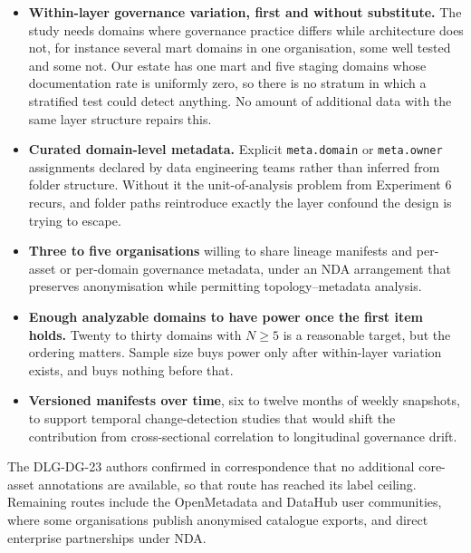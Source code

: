\documentclass[11pt,a4paper]{article}
\begin{document}
\begin{itemize}
  \item \textbf{Within-layer governance variation, first and without
        substitute.} The study needs domains where governance practice
        differs while architecture does not, for instance several mart
        domains in one organisation, some well tested and some not. Our
        estate has one mart and five staging domains whose documentation
        rate is uniformly zero, so there is no stratum in which a
        stratified test could detect anything. No amount of additional
        data with the same layer structure repairs this.

  \item \textbf{Curated domain-level metadata.} Explicit
        \texttt{meta.domain} or \texttt{meta.owner} assignments declared
        by data engineering teams rather than inferred from folder
        structure. Without it the unit-of-analysis problem from
        Experiment 6 recurs, and folder paths reintroduce exactly the
        layer confound the design is trying to escape.

  \item \textbf{Three to five organisations} willing to share lineage
        manifests and per-asset or per-domain governance metadata, under
        an NDA arrangement that preserves anonymisation while permitting
        topology--metadata analysis.

  \item \textbf{Enough analyzable domains to have power once the first
        item holds.} Twenty to thirty domains with $N \geq 5$ is a
        reasonable target, but the ordering matters. Sample size buys
        power only after within-layer variation exists, and buys nothing
        before that.

  \item \textbf{Versioned manifests over time}, six to twelve months of
        weekly snapshots, to support temporal change-detection studies
        that would shift the contribution from cross-sectional
        correlation to longitudinal governance drift.
\end{itemize}

The DLG-DG-23 authors confirmed in correspondence that no additional
core-asset annotations are available, so that route has reached its
label ceiling. Remaining routes include the OpenMetadata and DataHub
user communities, where some organisations publish anonymised catalogue
exports, and direct enterprise partnerships under NDA.
\end{document}
